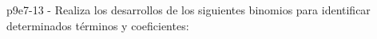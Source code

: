 \documentclass[spanish, 11pt]{exam}
\begin{document}
\begin{questions}
\begin{multicols}{3}
\begin{parts}
        \end{parts}
        \end{multicols}
        \question p9e7-13 - Realiza los desarrollos de los siguientes binomios para identificar determinados términos y coeficientes:
        \begin{multicols}{3} 
        \end{multicols}
        
    \end{questions}
    
\end{document}
